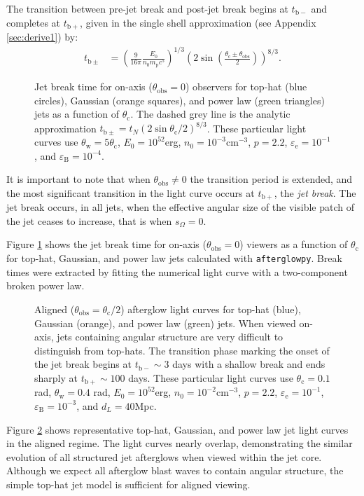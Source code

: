 \documentclass[twocolumn]{aastex62}
\newcommand{\afterglowpy}{{\tt afterglowpy}}
\newcommand{\tbm}{\ensuremath{t_{\mathrm{b-}}}}
\newcommand{\tbp}{\ensuremath{t_{\mathrm{b+}}}}
\newcommand{\tbpm}{\ensuremath{t_{\mathrm{b\pm}}}}
\newcommand{\thobs}{\ensuremath{\theta_{\mathrm{obs}}}}
\newcommand{\thW}{\ensuremath{\theta_{\mathrm{w}}}}
\newcommand{\thC}{\ensuremath{\theta_{\mathrm{c}}}}
\newcommand{\epse}{\ensuremath{\varepsilon_{\mathrm{e}}}}
\newcommand{\epsB}{\ensuremath{\varepsilon_{\mathrm{B}}}}
\newcommand{\Mp}{\ensuremath{m_{\mathrm{p}}}}
\newcommand{\som}{\ensuremath{s_{\Omega}}}
\begin{document}
The transition between pre-jet break and post-jet break begins at $\tbm$ and completes at $\tbp$, given in the single shell approximation (see Appendix \ref{sec:derive1}) by:
\begin{align}
	\tbpm &= \left(\frac{9}{16\pi} \frac{E_0}{n_0 \Mp c^5}\right)^{1/3} \left( 2 \sin \left(\frac{\thC\pm\thobs}{2}\right)\right)^{8/3} .\label{eq:tbpm}
\end{align}
\begin{figure}
	\caption{Jet break time for on-axis ($\thobs=0$) observers for top-hat (blue circles), Gaussian (orange squares), and power law (green triangles) jets as a function of $\thC$. The dashed grey line is the analytic approximation $\tbpm = t_N (2\sin \thC/2)^{8/3}$. These particular light curves use $\thW = 5 \thC$, $E_0 = 10^{52}$erg, $n_0=10^{-3}$cm$^{-3}$, $p=2.2$, $\epse = 10^{-1}$, and $\epsB = 10^{-4}$. \label{fig:tbOA}}
\end{figure}

It is important to note that when $\thobs \neq 0$ the transition period is extended, and the most significant transition in the light curve occurs at $\tbp$, the \emph{jet break}.  The jet break occurs, in all jets, when the effective angular size of the visible patch of the jet ceases to increase, that is when $\som = 0$.  

Figure \ref{fig:tbOA} shows the jet break time for on-axis ($\thobs = 0$) viewers as a function of $\thC$ for top-hat, Gaussian, and power law jets calculated with \afterglowpy{}. Break times were extracted by fitting the numerical light curve with a two-component broken power law.

\begin{figure}
	\caption{Aligned ($\thobs = \thC/2$) afterglow light curves for top-hat (blue), Gaussian (orange), and power law (green) jets. When viewed on-axis, jets containing angular structure are very difficult to distinguish from top-hats.  The transition phase marking the onset of the jet break begins at $\tbm\sim3$ days with a shallow break and ends sharply at $\tbp \sim 100$ days.  These particular light curves use $\thC = 0.1$ rad, $\thW = 0.4$ rad, $E_0 = 10^{52}$erg, $n_0=10^{-2}$cm$^{-3}$, $p=2.2$, $\epse = 10^{-1}$, $\epsB = 10^{-3}$, and $d_L=40$Mpc. \label{fig:onaxis}}
\end{figure}

Figure \ref{fig:onaxis} shows representative top-hat, Gaussian, and power law jet light curves in the aligned regime.  The light curves nearly overlap, demonstrating the similar evolution of all structured jet afterglows when viewed within the jet core.  Although we expect all afterglow blast waves to contain angular structure, the simple top-hat jet model is sufficient for aligned viewing.
\end{document}
